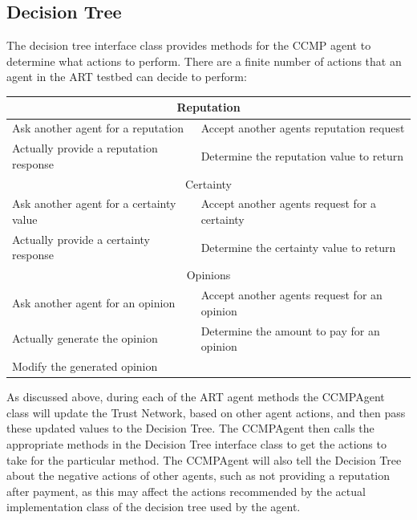 \subsection{Decision Tree}
The decision tree interface class provides methods for the CCMP agent to
determine what actions to perform.  There are a finite number of actions that
an agent in the ART testbed can decide to perform:
\begin{center}
\begin{tabular}{|l|l|}
\hline
\multicolumn{2}{|c|}{Reputation} \\
\hline
Ask another agent for a reputation & Accept another agents reputation request \\
\hline
Actually provide a reputation response & Determine the reputation value to
return \\ 
\hline
\multicolumn{2}{|c|}{Certainty} \\
\hline
Ask another agent for a certainty value & Accept another agents request for a
certainty \\
\hline
Actually provide a certainty response & Determine the certainty value to return
\\
\hline
\multicolumn{2}{|c|}{Opinions} \\
\hline
Ask another agent for an opinion & Accept another agents request for an
opinion \\
\hline
Actually generate the opinion & Determine the amount to pay for an
opinion \\
\hline
Modify the generated opinion & \\
\hline
\end{tabular}
\end{center}

As discussed above, during each of the ART agent methods the CCMPAgent class
will update the Trust Network, based on other agent actions, and then pass these
updated values to the Decision Tree.  The CCMPAgent then calls the appropriate
methods in the Decision Tree interface class to get the actions to take for the
particular method.  The CCMPAgent will also tell the Decision Tree about
the negative actions of other agents, such as not providing a reputation after
payment, as this may affect the actions recommended by the actual
implementation class of the decision tree used by the agent.  
